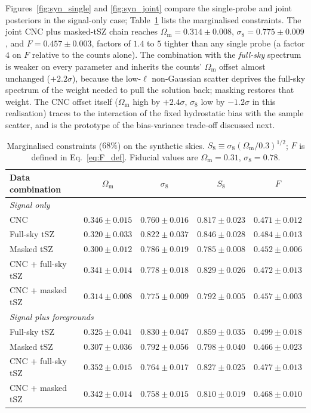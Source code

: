 \documentclass[aps,prd,twocolumn,superscriptaddress,nofootinbib,floatfix]{revtex4-2}
\begin{document}
Figures~\ref{fig:syn_single} and \ref{fig:syn_joint} compare the single-probe and joint posteriors in the signal-only case; Table~\ref{tab:constraints} lists the marginalised constraints.
The joint CNC plus masked-tSZ chain reaches $\Omega_{\mathrm{m}} = 0.314 \pm 0.008$, $\sigma_8 = 0.775 \pm 0.009$, and $F = 0.457 \pm 0.003$, factors of $1.4$ to $5$ tighter than any single probe (a factor $4$ on $F$ relative to the counts alone).
The combination with the \emph{full-sky} spectrum is weaker on every parameter and inherits the counts' $\Omega_{\mathrm{m}}$ offset almost unchanged ($+2.2\sigma$), because the low-$\ell$ non-Gaussian scatter deprives the full-sky spectrum of the weight needed to pull the solution back; masking restores that weight.
The CNC offset itself ($\Omega_{\mathrm{m}}$ high by $+2.4\sigma$, $\sigma_8$ low by $-1.2\sigma$ in this realisation) traces to the interaction of the fixed hydrostatic bias with the sample scatter, and is the prototype of the bias-variance trade-off discussed next.

\begin{table}
\caption{\label{tab:constraints}%
Marginalised constraints ($68\%$) on the synthetic skies.
$S_8 \equiv \sigma_8 (\Omega_{\mathrm{m}}/0.3)^{1/2}$; $F$ is defined in Eq.~\eqref{eq:F_def}.
Fiducial values are $\Omega_{\mathrm{m}} = 0.31$, $\sigma_8 = 0.78$.}
\begin{ruledtabular}
\begin{tabular}{lcccc}
Data combination & $\Omega_{\mathrm{m}}$ & $\sigma_8$ & $S_8$ & $F$ \\
\hline
\multicolumn{5}{l}{\emph{Signal only}}\\
CNC & $0.346 \pm 0.015$ & $0.760 \pm 0.016$ & $0.817 \pm 0.023$ & $0.471 \pm 0.012$ \\
Full-sky tSZ & $0.320 \pm 0.033$ & $0.822 \pm 0.037$ & $0.846 \pm 0.028$ & $0.484 \pm 0.013$ \\
Masked tSZ & $0.300 \pm 0.012$ & $0.786 \pm 0.019$ & $0.785 \pm 0.008$ & $0.452 \pm 0.006$ \\
CNC + full-sky tSZ & $0.341 \pm 0.014$ & $0.778 \pm 0.018$ & $0.829 \pm 0.026$ & $0.472 \pm 0.013$ \\
CNC + masked tSZ & $0.314 \pm 0.008$ & $0.775 \pm 0.009$ & $0.792 \pm 0.005$ & $0.457 \pm 0.003$ \\
\hline
\multicolumn{5}{l}{\emph{Signal plus foregrounds}}\\
Full-sky tSZ & $0.325 \pm 0.041$ & $0.830 \pm 0.047$ & $0.859 \pm 0.035$ & $0.499 \pm 0.018$ \\
Masked tSZ & $0.307 \pm 0.036$ & $0.792 \pm 0.056$ & $0.798 \pm 0.040$ & $0.466 \pm 0.023$ \\
CNC + full-sky tSZ & $0.352 \pm 0.015$ & $0.764 \pm 0.017$ & $0.827 \pm 0.025$ & $0.477 \pm 0.013$ \\
CNC + masked tSZ & $0.342 \pm 0.014$ & $0.758 \pm 0.015$ & $0.810 \pm 0.019$ & $0.468 \pm 0.010$ \\
\end{tabular}
\end{ruledtabular}
\end{table}
\end{document}
